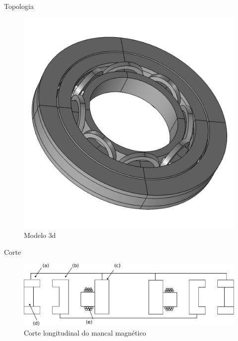 \documentclass{beamer}
\begin{document}
\begin{frame}{Topologia}
\begin{figure}[th!]
\centering
	\includegraphics[width=0.8\linewidth]{../../Dissertacao/Figs/mancais/modelo-elementos-finitos.png}
\caption*{Modelo 3d}
\end{figure}
\end{frame}

\begin{frame}{Corte}
\begin{figure}[th!]
\centering
\includegraphics[width=1\linewidth]{../../Dissertacao/Figs/mancais/mancal_corte2}
\caption*{Corte longitudinal do mancal magnético}
\end{figure}


\end{frame}
\end{document}
